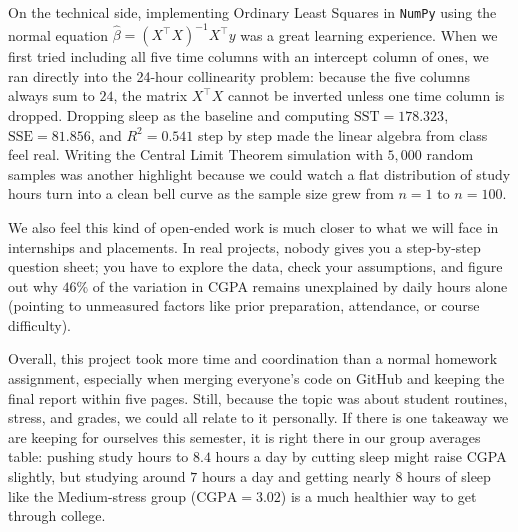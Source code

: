 \documentclass[11pt,a4paper]{article}
\begin{document}
On the technical side, implementing Ordinary Least Squares in \texttt{NumPy} using the normal equation $\hat{\beta} = (X^\top X)^{-1} X^\top y$ was a great learning experience. When we first tried including all five time columns with an intercept column of ones, we ran directly into the 24-hour collinearity problem: because the five columns always sum to $24$, the matrix $X^\top X$ cannot be inverted unless one time column is dropped. Dropping sleep as the baseline and computing $\text{SST} = 178.323$, $\text{SSE} = 81.856$, and $R^2 = 0.541$ step by step made the linear algebra from class feel real. Writing the Central Limit Theorem simulation with $5,000$ random samples was another highlight because we could watch a flat distribution of study hours turn into a clean bell curve as the sample size grew from $n=1$ to $n=100$.

We also feel this kind of open-ended work is much closer to what we will face in internships and placements. In real projects, nobody gives you a step-by-step question sheet; you have to explore the data, check your assumptions, and figure out why $46\%$ of the variation in CGPA remains unexplained by daily hours alone (pointing to unmeasured factors like prior preparation, attendance, or course difficulty).

Overall, this project took more time and coordination than a normal homework assignment, especially when merging everyone's code on GitHub and keeping the final report within five pages. Still, because the topic was about student routines, stress, and grades, we could all relate to it personally. If there is one takeaway we are keeping for ourselves this semester, it is right there in our group averages table: pushing study hours to $8.4$ hours a day by cutting sleep might raise CGPA slightly, but studying around $7$ hours a day and getting nearly $8$ hours of sleep like the Medium-stress group ($\text{CGPA} = 3.02$) is a much healthier way to get through college.
\end{document}
